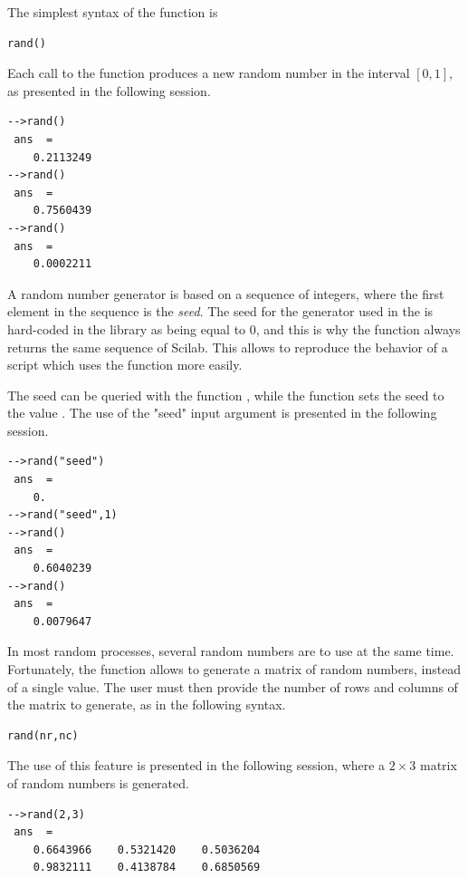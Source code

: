 The simplest syntax of the  function is
\lstset{language=scilabscript}
\begin{lstlisting}
rand()
\end{lstlisting}
Each call to the  function produces a new random
number in the interval $[0,1]$, as presented in the 
following session.
\lstset{language=scilabscript}
\begin{lstlisting}
-->rand()
 ans  =
    0.2113249  
-->rand()
 ans  =
    0.7560439  
-->rand()
 ans  =
    0.0002211  
\end{lstlisting}

A random number generator is based on a sequence of integers,
where the first element in the sequence is the \emph{seed}.
The seed for the generator used in the  is hard-coded
in the library as being equal to 0, and this is why the function always returns the 
same sequence of Scilab. This allows to reproduce the behavior 
of a script which uses the  function more easily.

The seed can be queried with the function ,
while the function  sets the seed to the 
value . The use of the "seed" input argument is 
presented in the following session.

\lstset{language=scilabscript}
\begin{lstlisting}
-->rand("seed")
 ans  =
    0.  
-->rand("seed",1)
-->rand()
 ans  =
    0.6040239  
-->rand()
 ans  =
    0.0079647  
\end{lstlisting}

In most random processes, several random numbers are to use
at the same time. Fortunately, the  function
allows to generate a matrix of random numbers, instead of a single 
value. The user must then provide the number of rows and columns 
of the matrix to generate, as in the following syntax.
\lstset{language=scilabscript}
\begin{lstlisting}
rand(nr,nc)
\end{lstlisting}
The use of this feature is presented in the following 
session, where a $2\times 3$ matrix of random numbers is 
generated.
\lstset{language=scilabscript}
\begin{lstlisting}
-->rand(2,3)
 ans  =
    0.6643966    0.5321420    0.5036204  
    0.9832111    0.4138784    0.6850569  
\end{lstlisting}

